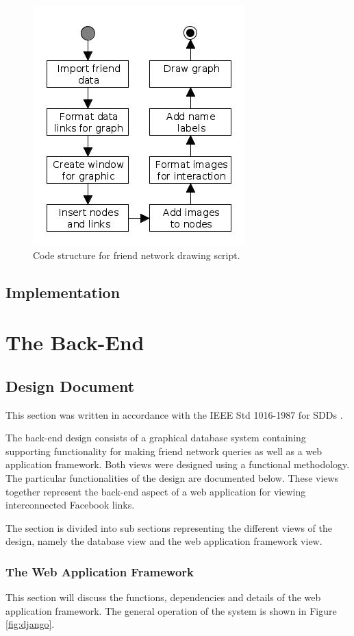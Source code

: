 \documentclass[12pt,onecolumn]{article}
\begin{document}
	\begin{figure}[h]
		\centering
		\includegraphics[scale=1]{network}
		\caption{Code structure for friend network drawing script.}
	\end{figure}
	
	\subsection{Implementation} %
	
	\section{The Back-End}
	
	\subsection{Design Document} %
	This section was written in accordance with the IEEE Std 1016-1987 for SDDs \cite{IEEE}. 
	
	The back-end design consists of a graphical database system containing supporting functionality for making friend network queries as well as a web application framework. Both views were designed using a functional methodology. The particular functionalities of the design are documented below. These views together represent the back-end aspect of a web application for viewing interconnected Facebook links.
	
	The section is divided into sub sections representing the different views of the design, namely the database view and the web application framework view.
	
	\subsubsection{The Web Application Framework}
	This section will discuss the functions, dependencies and details of the web application framework. The general operation of the system is shown in Figure \ref{fig:django}.
	
\end{document}
